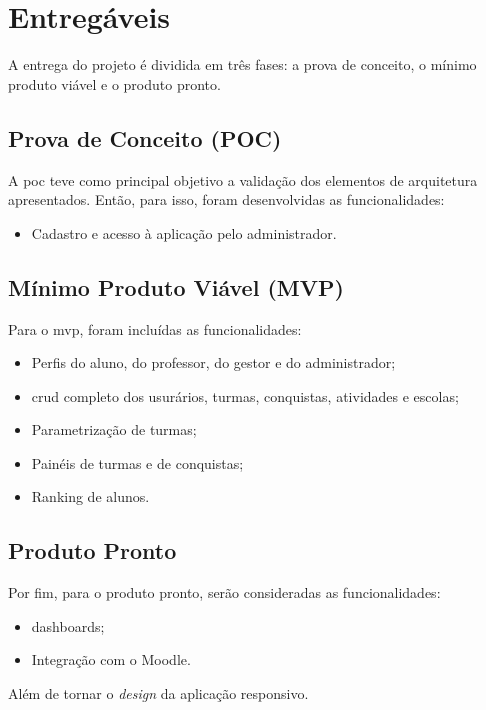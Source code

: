 \section{Entregáveis}
A entrega do projeto é dividida em três fases: a prova de conceito, o mínimo produto viável e o produto pronto.

\subsection{Prova de Conceito (POC)}
A \ac{poc} teve como principal objetivo a validação dos elementos de arquitetura apresentados. Então, para isso, foram desenvolvidas as funcionalidades:
 \begin{itemize}
     \item Cadastro e acesso à aplicação pelo administrador.
 \end{itemize}

\subsection{Mínimo Produto Viável (MVP)}
Para o \ac{mvp}, foram incluídas as funcionalidades:
\begin{itemize}
    \item Perfis do aluno, do professor, do gestor e do administrador;
    \item \ac{crud} completo dos usurários, turmas, conquistas, atividades e escolas;
    \item Parametrização de turmas;
    \item Painéis de turmas e de conquistas;
    \item Ranking de alunos.
\end{itemize}

\subsection{Produto Pronto}
Por fim, para o produto pronto, serão consideradas as funcionalidades:

\begin{itemize}
    \item \glspl{dashboard};
    \item Integração com o Moodle.
\end{itemize}

Além de tornar o \textit{design} da aplicação responsivo.